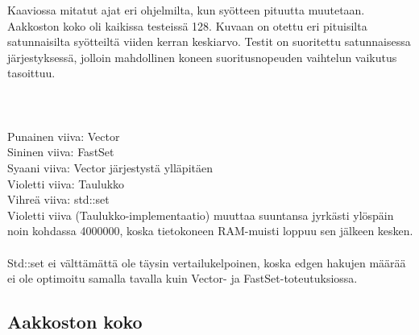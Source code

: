 \documentclass{article}
\begin{document}
            Kaaviossa mitatut ajat eri ohjelmilta, kun syötteen pituutta muutetaan. Aakkoston koko oli kaikissa testeissä 128.
            Kuvaan on otettu eri pituisilta satunnaisilta syötteiltä viiden kerran keskiarvo. Testit on suoritettu satunnaisessa
            järjestyksessä, jolloin mahdollinen koneen suoritusnopeuden vaihtelun vaikutus tasoittuu.
            \\ \\
             \\ \\
            Punainen viiva: Vector  \\
            Sininen viiva: FastSet  \\
            Syaani viiva: Vector järjestystä ylläpitäen \\ 
            Violetti viiva: Taulukko  \\
            Vihreä viiva: std::set \\
            Violetti viiva (Taulukko-implementaatio) muuttaa suuntansa jyrkästi ylöspäin noin kohdassa 4000000, koska tietokoneen
            RAM-muisti loppuu sen jälkeen kesken.
            \\ \\
            Std::set ei välttämättä ole täysin vertailukelpoinen, koska edgen hakujen määrää ei ole optimoitu samalla tavalla kuin
            Vector- ja FastSet-toteutuksiossa.
            
        \newpage
        \subsection{Aakkoston koko}
        
\end{document}
